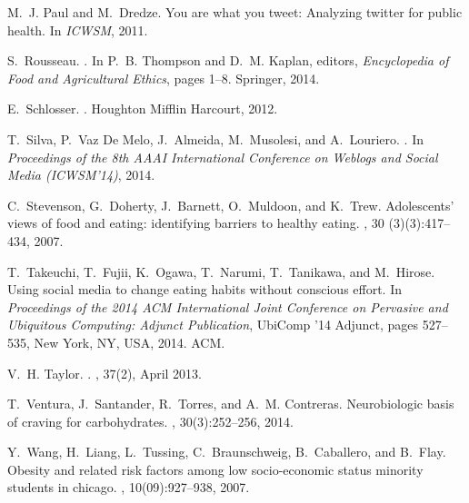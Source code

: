 \documentclass{sig-alternate-2013}
\begin{document}
\begin{thebibliography}{10}
M.~J. Paul and M.~Dredze.
\newblock You are what you tweet: Analyzing twitter for public health.
\newblock In {\em ICWSM}, 2011.

S.~Rousseau.
.
\newblock In P.~B. Thompson and D.~M. Kaplan, editors, {\em Encyclopedia of
  Food and Agricultural Ethics}, pages 1--8. Springer, 2014.

E.~Schlosser.
.
\newblock Houghton Mifflin Harcourt, 2012.

T.~Silva, P.~{Vaz De Melo}, J.~Almeida, M.~Musolesi, and A.~Louriero.
.
\newblock In {\em Proceedings of the 8th AAAI International Conference on
  Weblogs and Social Media (ICWSM'14)}, 2014.

C.~Stevenson, G.~Doherty, J.~Barnett, O.~Muldoon, and K.~Trew.
\newblock Adolescents' views of food and eating: identifying barriers to
  healthy eating.
, 30 (3)(3):417--434, 2007.

T.~Takeuchi, T.~Fujii, K.~Ogawa, T.~Narumi, T.~Tanikawa, and M.~Hirose.
\newblock Using social media to change eating habits without conscious effort.
\newblock In {\em Proceedings of the 2014 ACM International Joint Conference on
  Pervasive and Ubiquitous Computing: Adjunct Publication}, UbiComp '14
  Adjunct, pages 527--535, New York, NY, USA, 2014. ACM.

V.~H. Taylor.
.
, 37(2), April 2013.

T.~Ventura, J.~Santander, R.~Torres, and A.~M. Contreras.
\newblock Neurobiologic basis of craving for carbohydrates.
, 30(3):252--256, 2014.

Y.~Wang, H.~Liang, L.~Tussing, C.~Braunschweig, B.~Caballero, and B.~Flay.
\newblock Obesity and related risk factors among low socio-economic status
  minority students in chicago.
, 10(09):927--938, 2007.

\end{thebibliography}


\balancecolumns
\end{document}
